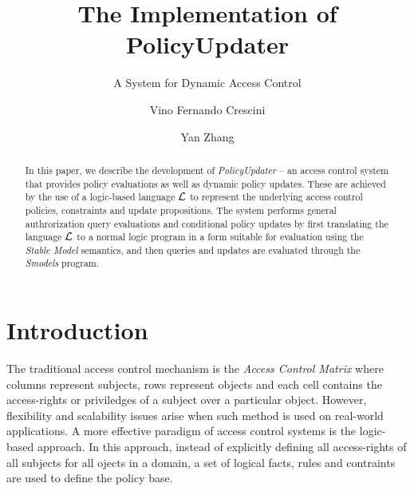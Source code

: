 \documentclass{llncs}
\begin{document}
  \long{}

  \title{The Implementation of PolicyUpdater}
  \subtitle{A System for Dynamic Access Control}

  \author{Vino Fernando Crescini \and Yan Zhang}


  \maketitle

  \begin{abstract}
    In this paper, we describe the development of \emph{PolicyUpdater} -- an
    access control system that provides policy evaluations as well as dynamic
    policy updates. These are achieved by the use of a logic-based language
    $\cal{L}$ to represent the underlying access control policies, constraints
    and update propositions. The system performs general authrorization query
    evaluations and conditional policy updates by first translating the language
    $\cal{L}$ to a normal logic program in a form suitable for evaluation using
    the \emph{Stable Model} semantics, and then queries and updates are
    evaluated through the \emph{Smodels} program.
  \end{abstract}

  \section{Introduction}

    The traditional access control mechanism is the \emph{Access Control Matrix}
    where columns represent subjects, rows represent objects and each cell
    contains the access-rights or priviledges of a subject over a particular
    object. However, flexibility and scalability issues arise when such method
    is used on real-world applications. A more effective paradigm of access
    control systems is the logic-based approach. In this approach, instead of
    explicitly defining all access-rights of all subjects for all ojects in a
    domain, a set of logical facts, rules and contraints are used to define the
    policy base. 
\end{document}
